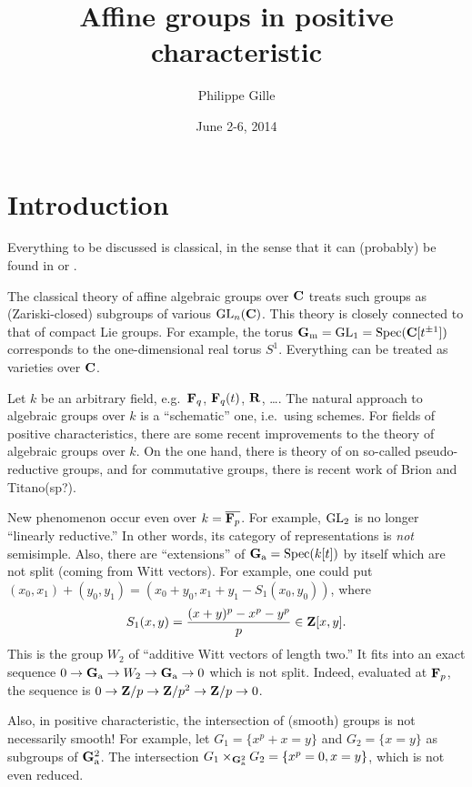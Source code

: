 \documentclass{article}
\title{Affine groups in positive characteristic}
\author{Philippe Gille}
\date{June 2-6, 2014}
\begin{document}
\maketitle
\tableofcontents





\section*{Introduction}

Everything to be discussed is classical, in the sense that it can (probably) be 
found in \cite{dg80} or \cite{milneAGS}. 

The classical theory of affine algebraic groups over $\mathbf{C}$ treats such groups 
as (Zariski-closed) subgroups of various $\operatorname{GL}_n(\mathbf{C})$. This theory 
is closely connected to that of compact Lie groups. For example, the torus 
$\mathbf{G}_{\mathrm{m}}=\operatorname{GL}_1=\operatorname{Spec}(\mathbf{C}[t^{\pm 1}])$ corresponds to the 
one-dimensional real torus $S^1$. Everything can be treated as varieties over 
$\mathbf{C}$. 

Let $k$ be an arbitrary field, e.g.\ $\mathbf{F}_q$, $\mathbf{F}_q(t)$, $\mathbf{R}$, \ldots. The 
natural approach to algebraic groups over $k$ is a ``schematic'' one, i.e.\ 
using schemes. For fields of positive characteristics, there are some recent 
improvements to the theory of algebraic groups over $k$. On the one hand, there 
is theory of \cite{cgp10} on so-called pseudo-reductive groups, and 
for commutative groups, there is recent work of Brion and Titano(sp?). 

New phenomenon occur even over $k=\overline{\mathbf{F}_p}$. For example, 
$\operatorname{GL}_2$ is no longer ``linearly reductive.'' In other words, its 
category of representations is \emph{not} semisimple. Also, there are 
``extensions'' of $\mathbf{G}_{\mathrm{a}}=\operatorname{Spec}(k[t])$ by itself which are not 
split (coming from Witt vectors). For example, one could put 
$(x_0,x_1)+(y_0,y_1) = (x_0+y_0, x_1+y_1-S_1(x_0,y_0))$, where 
\[
  S_1(x,y) = \frac{(x+y)^p - x^p-y^p}{p} \in \mathbf{Z}[x,y] .
\]
This is the group $W_2$ of ``additive Witt vectors of length two.'' It fits 
into an exact sequence $0 \to \mathbf{G}_{\mathrm{a}} \to W_2 \to \mathbf{G}_{\mathrm{a}} \to 0$ 
which is not split. Indeed, evaluated at $\mathbf{F}_p$, the sequence is 
$0 \to \mathbf{Z}/p \to \mathbf{Z}/p^2 \to \mathbf{Z}/p \to 0$. 

Also, in positive characteristic, the intersection of (smooth) groups is not 
necessarily smooth! For example, let $G_1=\{x^p+x=y\}$ and 
$G_2=\{x=y\}$ as subgroups of $\mathbf{G}_{\mathrm{a}}^2$. The intersection 
$G_1\times_{\mathbf{G}_{\mathrm{a}}^2} G_2 = \{x^p=0, x=y\}$, which is not even reduced. 
\end{document}

